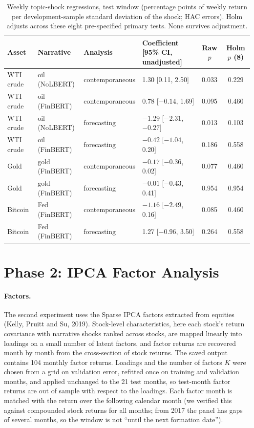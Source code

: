 \documentclass[11pt]{article}
\begin{document}
\begin{table}[t]
\centering\small
\begin{tabular}{@{}llllcc@{}}
\toprule
Asset & Narrative & Analysis & Coefficient [95\% CI, unadjusted] & Raw $p$ & Holm $p$ (8) \\
\midrule
WTI crude & oil (NoLBERT) & contemporaneous & 1.30 [0.11, 2.50] & 0.033 & 0.229 \\
WTI crude & oil (FinBERT) & contemporaneous & 0.78 [$-0.14$, 1.69] & 0.095 & 0.460 \\
WTI crude & oil (NoLBERT) & forecasting & $-1.29$ [$-2.31$, $-0.27$] & 0.013 & 0.103 \\
WTI crude & oil (FinBERT) & forecasting & $-0.42$ [$-1.04$, 0.20] & 0.186 & 0.558 \\
Gold & gold (FinBERT) & contemporaneous & $-0.17$ [$-0.36$, 0.02] & 0.077 & 0.460 \\
Gold & gold (FinBERT) & forecasting & $-0.01$ [$-0.43$, 0.41] & 0.954 & 0.954 \\
Bitcoin & Fed (FinBERT) & contemporaneous & $-1.16$ [$-2.49$, 0.16] & 0.085 & 0.460 \\
Bitcoin & Fed (FinBERT) & forecasting & 1.27 [$-0.96$, 3.50] & 0.264 & 0.558 \\
\bottomrule
\end{tabular}
\caption{Weekly topic-shock regressions, test window (percentage points of weekly return per development-sample standard deviation of the shock; HAC errors). Holm adjusts across these eight pre-specified primary tests. None survives adjustment.}
\label{tab:topic}
\end{table}

\section{Phase 2: IPCA Factor Analysis}
\label{sec:phase2}

\paragraph{Factors.} The second experiment uses the Sparse IPCA factors extracted from equities (Kelly, Pruitt and Su, 2019). Stock-level characteristics, here each stock's return covariance with narrative shocks ranked across stocks, are mapped linearly into loadings on a small number of latent factors, and factor returns are recovered month by month from the cross-section of stock returns. The saved output contains 104 monthly factor returns. Loadings and the number of factors $K$ were chosen from a grid on validation error, refitted once on training and validation months, and applied unchanged to the 21 test months, so test-month factor returns are out of sample with respect to the loadings. Each factor month is matched with the return over the following calendar month (we verified this against compounded stock returns for all months; from 2017 the panel has gaps of several months, so the window is not ``until the next formation date'').
\end{document}
